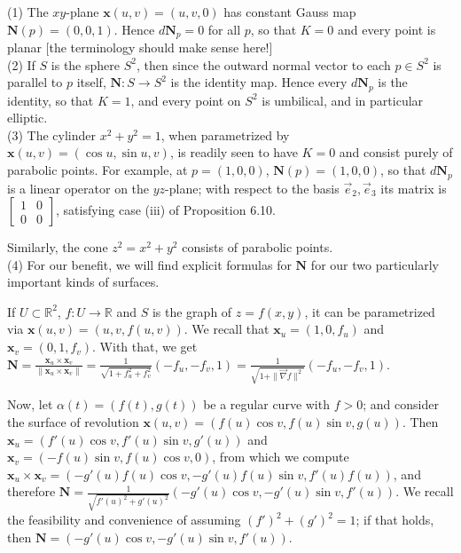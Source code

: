 \documentclass[leqno]{book}
\begin{document}
(1) The $xy$-plane $\mathbf x(u,v)=(u,v,0)$ has constant Gauss map $\mathbf N(p)=(0,0,1)$.  Hence $d\mathbf N_p=0$ for all $p$, so that $K=0$ and every point is planar [the terminology should make sense here!]\\

(2) If $S$ is the sphere $S^2$, then since the outward normal vector to each $p\in S^2$ is parallel to $p$ itself, $\mathbf N:S\to S^2$ is the identity map.  Hence every $d\mathbf N_p$ is the identity, so that $K=1$, and every point on $S^2$ is umbilical, and in particular elliptic.\\

(3) The cylinder $x^2+y^2=1$, when parametrized by $\mathbf x(u,v)=(\cos u,\sin u,v)$, is readily seen to have $K=0$ and consist purely of parabolic points.  For example, at $p=(1,0,0)$, $\mathbf N(p)=(1,0,0)$, so that $d\mathbf N_p$ is a linear operator on the $yz$-plane; with respect to the basis $\vec e_2,\vec e_3$ its matrix is $\begin{bmatrix}1&0\\0&0\end{bmatrix}$, satisfying case (iii) of Proposition 6.10.

Similarly, the cone $z^2=x^2+y^2$ consists of parabolic points.\\

(4) For our benefit, we will find explicit formulas for $\mathbf N$ for our two particularly important kinds of surfaces.

If $U\subset\mathbb R^2$, $f:U\to\mathbb R$ and $S$ is the graph of $z=f(x,y)$, it can be parametrized via $\mathbf x(u,v)=(u,v,f(u,v))$.  We recall that $\mathbf x_u=(1,0,f_u)$ and $\mathbf x_v=(0,1,f_v)$.  With that, we get $\mathbf N=\frac{\mathbf x_u\times\mathbf x_v}{\|\mathbf x_u\times\mathbf x_v\|}=\frac 1{\sqrt{1+f_u^2+f_v^2}}(-f_u,-f_v,1)=\frac 1{\sqrt{1+\|\vec\nabla f\|^2}}(-f_u,-f_v,1)$.

Now, let $\alpha(t)=(f(t),g(t))$ be a regular curve with $f>0$; and consider the surface of revolution $\mathbf x(u,v)=(f(u)\cos v,f(u)\sin v,g(u))$.  Then $\mathbf x_u=(f'(u)\cos v,f'(u)\sin v,g'(u))$ and $\mathbf x_v=(-f(u)\sin v,f(u)\cos v,0)$, from which we compute $\mathbf x_u\times\mathbf x_v=(-g'(u)f(u)\cos v,-g'(u)f(u)\sin v,f'(u)f(u))$, and therefore $\mathbf N=\frac 1{\sqrt{f'(u)^2+g'(u)^2}}(-g'(u)\cos v,-g'(u)\sin v,f'(u))$.  We recall the feasibility and convenience of assuming $(f')^2+(g')^2=1$; if that holds, then $\mathbf N=(-g'(u)\cos v,-g'(u)\sin v,f'(u))$.\\
\end{document}
